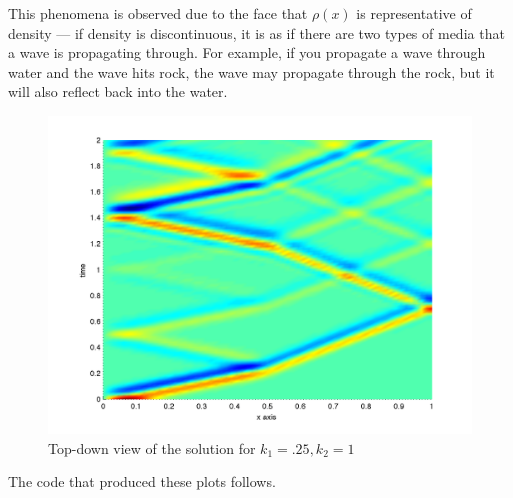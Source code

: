 {\begin{solution}
\begin{enumerate}
This phenomena is observed due to the face that $\rho(x)$ is representative of density --- if density is discontinuous, it is as if there are two types of media that a wave is propagating through.  For example, if you propagate a wave through water and the wave hits rock, the wave may propagate through the rock, but it will also reflect back into the water.  

\begin{figure}
\centering
\includegraphics[width=.7\textwidth]{wavefem_2.png}
\caption{Top-down view of the solution for $k_1 = .25, k_2 = 1$}
\end{figure}

\end{enumerate}

The code that produced these plots follows.



\end{solution}

}{}
